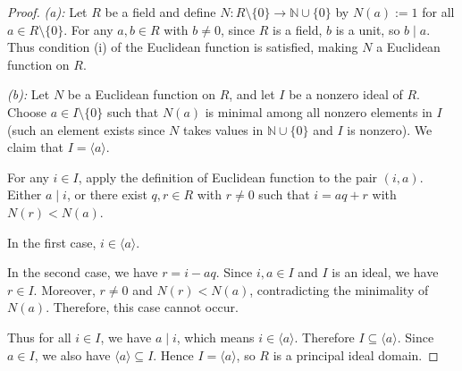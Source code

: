 \begin{proof}
\noindent \textit{(a):} Let $R$ be a field and define $N: R \setminus \{0\} \to \mathbb{N} \cup \{0\}$ by $N(a) := 1$ for all $a \in R \setminus \{0\}$. For any $a, b \in R$ with $b \neq 0$, since $R$ is a field, $b$ is a unit, so $b \mid a$. Thus condition (i) of the Euclidean function is satisfied, making $N$ a Euclidean function on $R$.

\medskip
\noindent \textit{(b):} Let $N$ be a Euclidean function on $R$, and let $I$ be a nonzero ideal of $R$. Choose $a \in I \setminus \{0\}$ such that $N(a)$ is minimal among all nonzero elements in $I$ (such an element exists since $N$ takes values in $\mathbb{N} \cup \{0\}$ and $I$ is nonzero). We claim that $I = \langle a \rangle$.

For any $i \in I$, apply the definition of Euclidean function to the pair $(i, a)$. Either $a \mid i$, or there exist $q, r \in R$ with $r \neq 0$ such that $i = aq + r$ with $N(r) < N(a)$.

In the first case, $i \in \langle a \rangle$.

In the second case, we have $r = i - aq$. Since $i, a \in I$ and $I$ is an ideal, we have $r \in I$. Moreover, $r \neq 0$ and $N(r) < N(a)$, contradicting the minimality of $N(a)$. Therefore, this case cannot occur.

Thus for all $i \in I$, we have $a \mid i$, which means $i \in \langle a \rangle$. Therefore $I \subseteq \langle a \rangle$. Since $a \in I$, we also have $\langle a \rangle \subseteq I$. Hence $I = \langle a \rangle$, so $R$ is a principal ideal domain.
\end{proof}

